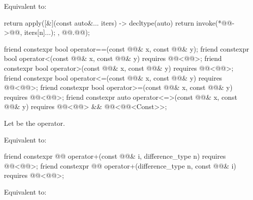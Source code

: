 \begin{itemdescr}
\pnum
\effects
Equivalent to:
\begin{codeblock}
return apply([&](const auto&... iters) -> decltype(auto) {
  return invoke(*@@->@@, iters[n]...);
}, @@.@@);
\end{codeblock}
\end{itemdescr}

%
\begin{itemdecl}
friend constexpr bool operator==(const @@& x, const @@& y);
friend constexpr bool operator<(const @@& x, const @@& y)
  requires @@<@@>;
friend constexpr bool operator>(const @@& x, const @@& y)
  requires @@<@@>;
friend constexpr bool operator<=(const @@& x, const @@& y)
  requires @@<@@>;
friend constexpr bool operator>=(const @@& x, const @@& y)
  requires @@<@@>;
friend constexpr auto operator<=>(const @@& x, const @@& y)
  requires @@<@@> && @@<@@<Const>>;
\end{itemdecl}

\begin{itemdescr}
\pnum
Let  be the operator.

\pnum
\effects
Equivalent to: 
\end{itemdescr}

%
\begin{itemdecl}
friend constexpr @@ operator+(const @@& i, difference_type n)
  requires @@<@@>;
friend constexpr @@ operator+(difference_type n, const @@& i)
  requires @@<@@>;
\end{itemdecl}

\begin{itemdescr}
\pnum
\effects
Equivalent to: 
\end{itemdescr}

